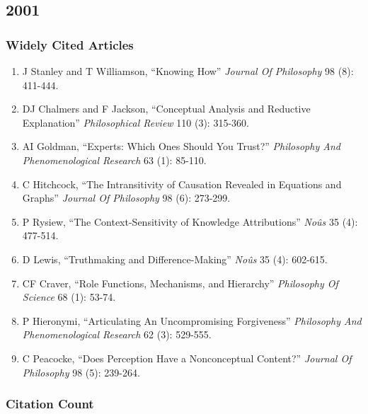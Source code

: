 \documentclass[
  10pt,
  letterpaper,
  DIV=11,
  numbers=noendperiod,
  twoside]{scrartcl}
\providecommand{\tightlist}{%
  \setlength{\itemsep}{0pt}\setlength{\parskip}{0pt}}\usepackage{longtable,booktabs,array}
\begin{document}
\newpage

\subsection{2001}\label{section-25}

\subsubsection*{Widely Cited Articles}\label{widely-cited-articles-25}

\begin{enumerate}
\def\labelenumi{\arabic{enumi}.}
\tightlist
\item
  J Stanley and T Williamson, ``Knowing How'' \emph{Journal Of
  Philosophy} 98 (8): 411-444.
\item
  DJ Chalmers and F Jackson, ``Conceptual Analysis and Reductive
  Explanation'' \emph{Philosophical Review} 110 (3): 315-360.
\item
  AI Goldman, ``Experts: Which Ones Should You Trust?'' \emph{Philosophy
  And Phenomenological Research} 63 (1): 85-110.
\item
  C Hitchcock, ``The Intransitivity of Causation Revealed in Equations
  and Graphs'' \emph{Journal Of Philosophy} 98 (6): 273-299.
\item
  P Rysiew, ``The Context-Sensitivity of Knowledge Attributions''
  \emph{Noûs} 35 (4): 477-514.
\item
  D Lewis, ``Truthmaking and Difference-Making'' \emph{Noûs} 35 (4):
  602-615.
\item
  CF Craver, ``Role Functions, Mechanisms, and Hierarchy''
  \emph{Philosophy Of Science} 68 (1): 53-74.
\item
  P Hieronymi, ``Articulating An Uncompromising Forgiveness''
  \emph{Philosophy And Phenomenological Research} 62 (3): 529-555.
\item
  C Peacocke, ``Does Perception Have a Nonconceptual Content?''
  \emph{Journal Of Philosophy} 98 (5): 239-264.
\end{enumerate}

\subsubsection*{Citation Count}\label{citation-count-25}
\end{document}
